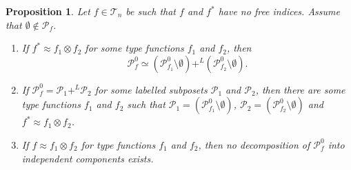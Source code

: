 \documentclass[12pt]{article}
\newtheorem{prop}{Proposition}
\theoremstyle{definition}
\theoremstyle{remark}
\def\indep{+^L}
\def\Te{\mathcal T}
\def\Pe{\mathcal P}
\begin{document}
\begin{prop}\label{prop:nofree_components} Let $f\in \Te_n$ be such that $f$ and  $f^*$ have no
free indices. Assume that $\emptyset \notin \Pe_{f}$. 
\begin{enumerate}
\item[(i)] If $f^*\approx f_1\otimes f_2$ for some type functions $f_1$ and
$f_2$, then 
\[
\Pe_f^0\simeq (\Pe_{f_1}^0\setminus \emptyset) \indep  (\Pe_{f_2}^0\setminus
\emptyset).
\]
\item[(ii)] If $\Pe_f^0=\Pe_1\indep \Pe_2$ for some labelled subposets $\Pe_1$ and $\Pe_2$, 
then there are some type functions $f_1$ and $f_2$ such that $\Pe_1=(\Pe_{f_1}^0\setminus
\emptyset)$, $\Pe_2=(\Pe_{f_2}^0\setminus \emptyset)$ and
$f^*\approx f_1\otimes f_2$.
\item[(iii)] If $f\approx f_1\otimes f_2$ for type functions $f_1$ and
$f_2$, then no 
decomposition of $\Pe_f^0$ into independent components exists.

\end{enumerate}

\end{prop}
\end{document}

